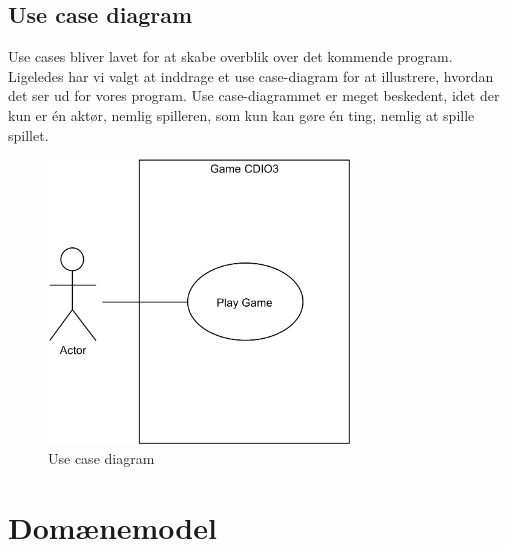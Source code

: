 \subsection{Use case diagram}
Use cases bliver lavet for at skabe overblik over det kommende program.
Ligeledes har vi valgt at inddrage et use case-diagram for at illustrere, hvordan det ser ud for vores program.
Use case-diagrammet er meget beskedent, idet der kun er én aktør, nemlig spilleren, som kun kan gøre én ting, nemlig at spille spillet.
\begin{figure}[H]
    \begin{center}
        \includegraphics[width=8cm]{graphics/usecases/UseCase1.png}
        \caption{Use case diagram}
        \label{fig:use_case_diagram}
    \end{center}
\end{figure}

\pagebreak
\section{Domænemodel}
